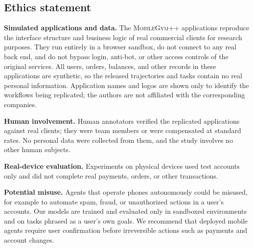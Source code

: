 \subsection*{Ethics statement}

\textbf{Simulated applications and data.}
The \textsc{MobileGym++} applications reproduce the interface structure and business logic of real commercial clients for research purposes. They run entirely in a browser sandbox, do not connect to any real back end, and do not bypass login, anti-bot, or other access controls of the original services. All users, orders, balances, and other records in these applications are synthetic, so the released trajectories and tasks contain no real personal information. Application names and logos are shown only to identify the workflows being replicated; the authors are not affiliated with the corresponding companies.

\textbf{Human involvement.}
Human annotators verified the replicated applications against real clients; they were team members or were compensated at standard rates. No personal data were collected from them, and the study involves no other human subjects.

\textbf{Real-device evaluation.}
Experiments on physical devices used test accounts only and did not complete real payments, orders, or other transactions.

\textbf{Potential misuse.}
Agents that operate phones autonomously could be misused, for example to automate spam, fraud, or unauthorized actions in a user's accounts. Our models are trained and evaluated only in sandboxed environments and on tasks phrased as a user's own goals. We recommend that deployed mobile agents require user confirmation before irreversible actions such as payments and account changes.
